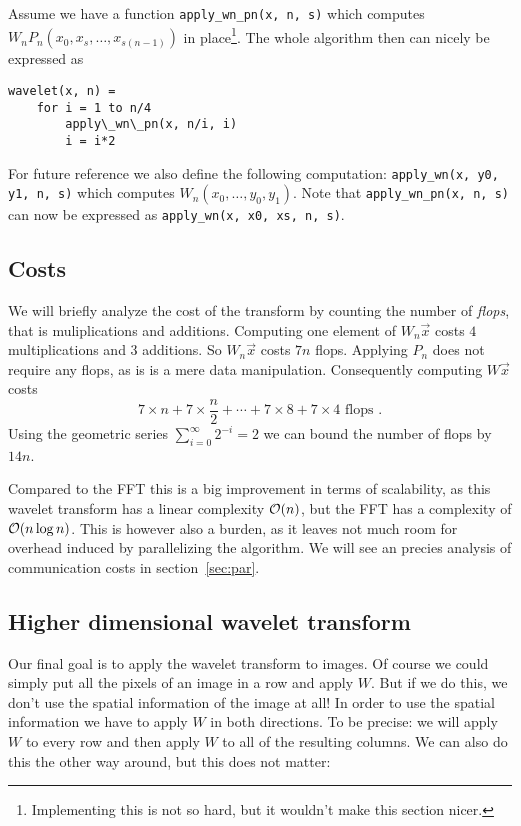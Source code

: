 Assume we have a function \texttt{apply\_wn\_pn(x, n, s)} which computes $W_n P_n (x_0, x_s, \ldots, x_{s(n-1)})$ in place\footnote{Implementing this is not so hard, but it wouldn't make this section nicer.}. The whole algorithm then can nicely be expressed as

\begin{lstlisting}
wavelet(x, n) =
	for i = 1 to n/4
		apply\_wn\_pn(x, n/i, i)
		i = i*2
\end{lstlisting}

For future reference we also define the following computation: \texttt{apply\_wn(x, y0, y1, n, s)} which computes $W_n (x_0, \ldots, y_0, y_1)$. Note that \texttt{apply\_wn\_pn(x, n, s)} can now be expressed as \texttt{apply\_wn(x, x0, xs, n, s)}.


\subsection{Costs}
We will briefly analyze the cost of the transform by counting the number of \emph{flops}, that is muliplications and additions. Computing one element of $W_n \vec{x}$ costs $4$ multiplications and $3$ additions. So $W_n \vec{x}$ costs $7n$ flops. Applying  $P_n$ does not require any flops, as is is a mere data manipulation. Consequently computing $W \vec{x}$ costs
\[ 7 \times n + 7 \times \frac{n}{2} + \cdots +  7 \times 8 + 7 \times 4 \text{ flops }. \]
Using the geometric series $\sum_{i=0}^\infty 2^{-i} = 2$ we can bound the number of flops by $14n$.

Compared to the FFT this is a big improvement in terms of scalability, as this wavelet transform has a linear complexity $\mathcal{O}(n)$, but the FFT has a complexity of $\mathcal{O}(n \log n)$. This is however also a burden, as it leaves not much room for overhead induced by parallelizing the algorithm. We will see an precies analysis of communication costs in section~\ref{sec:par}.


\subsection{Higher dimensional wavelet transform}
Our final goal is to apply the wavelet transform to images. Of course we could simply put all the pixels of an image in a row and apply $W$. But if we do this, we don't use the spatial information of the image at all! In order to use the spatial information we have to apply $W$ in both directions. To be precise: we will apply $W$ to every row and then apply $W$ to all of the resulting columns. We can also do this the other way around, but this does not matter:

